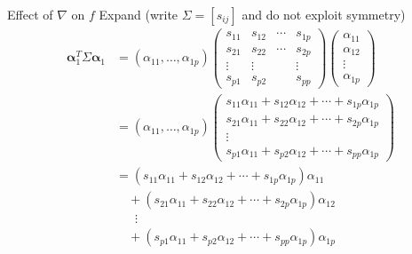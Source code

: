 \documentclass[aspectratio=169]{beamer}\usepackage[]{graphicx}\usepackage[]{xcolor}
\begin{document}
\begin{frame}{Effect of $\nabla$ on $f$}
Expand (write $\Sigma=[s_{ij}]$ and do not exploit symmetry)
\begin{align*}
\bm{\alpha}_1^T\Sigma\bm{\alpha}_1 &=
\left(\alpha_{11},\ldots,\alpha_{1p}\right)
\begin{pmatrix}
s_{11} & s_{12} & \cdots & s_{1p} \\
s_{21} & s_{22} & \cdots & s_{2p} \\
\vdots & \vdots & & \vdots \\
s_{p1} & s_{p2} & & s_{pp}
\end{pmatrix}
\begin{pmatrix}
\alpha_{11} \\ \alpha_{12} \\ \vdots \\ \alpha_{1p}
\end{pmatrix} \\
&=
\left(\alpha_{11},\ldots,\alpha_{1p}\right)
\begin{pmatrix}
s_{11}\alpha_{11}+s_{12}\alpha_{12}+\cdots+s_{1p}\alpha_{1p} \\
s_{21}\alpha_{11}+s_{22}\alpha_{12}+\cdots+s_{2p}\alpha_{1p} \\
\vdots \\
s_{p1}\alpha_{11}+s_{p2}\alpha_{12}+\cdots+s_{pp}\alpha_{1p}
\end{pmatrix} \\
&=
(s_{11}\alpha_{11}+s_{12}\alpha_{12}+\cdots+s_{1p}\alpha_{1p})\alpha_{11} \\
&\quad +
(s_{21}\alpha_{11}+s_{22}\alpha_{12}+\cdots+s_{2p}\alpha_{1p})\alpha_{12} \\
&\quad\;\;\vdots \\
&\quad +
(s_{p1}\alpha_{11}+s_{p2}\alpha_{12}+\cdots+s_{pp}\alpha_{1p})\alpha_{1p}
\end{align*}
\end{frame}
\end{document}
